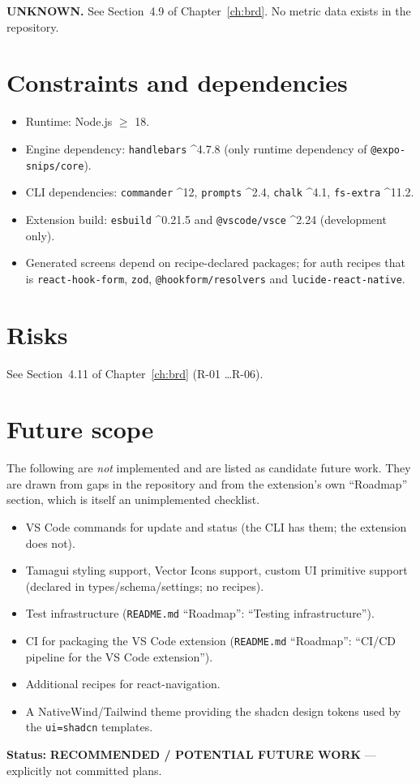\textbf{UNKNOWN.} See Section~4.9 of Chapter~\ref{ch:brd}. No metric data exists
in the repository.

\section{Constraints and dependencies}

\begin{itemize}
  \item Runtime: Node.js $\geq$ 18.
  \item Engine dependency: \texttt{handlebars} \^{}4.7.8 (only runtime dependency of
        \texttt{@expo-snips/core}).
  \item CLI dependencies: \texttt{commander} \^{}12, \texttt{prompts} \^{}2.4,
        \texttt{chalk} \^{}4.1, \texttt{fs-extra} \^{}11.2.
  \item Extension build: \texttt{esbuild} \^{}0.21.5 and \texttt{@vscode/vsce} \^{}2.24
        (development only).
  \item Generated screens depend on recipe-declared packages; for auth recipes
        that is \texttt{react-hook-form}, \texttt{zod}, \texttt{@hookform/resolvers}
        and \texttt{lucide-react-native}.
\end{itemize}

\section{Risks}

See Section~4.11 of Chapter~\ref{ch:brd} (R-01 \dots R-06).

\section{Future scope}

The following are \emph{not} implemented and are listed as candidate future work.
They are drawn from gaps in the repository and from the extension's own
``Roadmap'' section, which is itself an unimplemented checklist.

\begin{itemize}
  \item VS Code commands for update and status (the CLI has them; the extension
        does not).
  \item Tamagui styling support, Vector Icons support, custom UI primitive
        support (declared in types/schema/settings; no recipes).
  \item Test infrastructure (\texttt{README.md} ``Roadmap'': ``Testing
        infrastructure'').
  \item CI for packaging the VS Code extension (\texttt{README.md} ``Roadmap'':
        ``CI/CD pipeline for the VS Code extension'').
  \item Additional recipes for react-navigation.
  \item A NativeWind/Tailwind theme providing the shadcn design tokens used by
        the \texttt{ui=shadcn} templates.
\end{itemize}

\textbf{Status:} \textbf{RECOMMENDED / POTENTIAL FUTURE WORK} --- explicitly not
committed plans.
